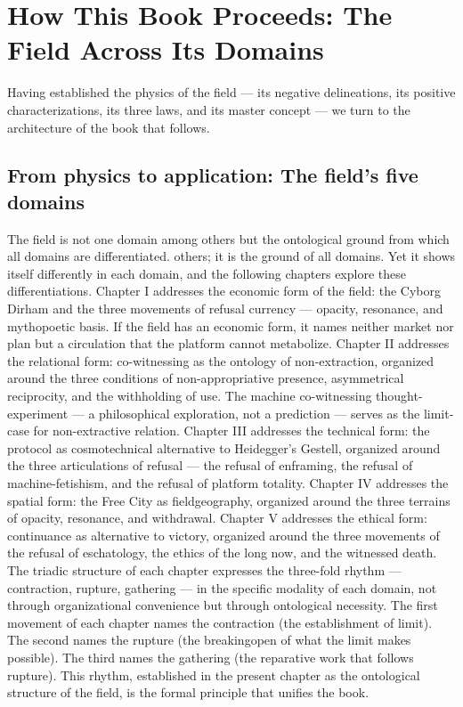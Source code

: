 \section{How This Book Proceeds: The Field Across Its Domains}

Having established the physics of the field --- its negative delineations, its positive characterizations, its three laws, and its master concept --- we turn to the architecture of the book that follows.

\subsection{From physics to application: The field's five domains}

The field is not one domain among others but the ontological ground from which all domains are differentiated. others; it is the ground of all domains. Yet it shows itself differently in each domain, and the following chapters explore these differentiations. Chapter I addresses the economic form of the field: the Cyborg Dirham and the three movements of refusal currency — opacity, resonance, and mythopoetic basis. If the field has an economic form, it names neither market nor plan but a circulation that the platform cannot metabolize. Chapter II addresses the relational form: co-witnessing as the ontology of non-extraction, organized around the three conditions of non-appropriative presence, asymmetrical reciprocity, and the withholding of use. The machine co-witnessing thought-experiment — a philosophical exploration, not a prediction — serves as the limit-case for non-extractive relation. Chapter III addresses the technical form: the   protocol as cosmotechnical alternative to Heidegger’s Gestell, organized around the three articulations of refusal — the refusal of enframing, the refusal of machine-fetishism, and the refusal of platform totality. Chapter IV addresses the spatial form: the Free City as fieldgeography, organized around the three terrains of opacity, resonance, and withdrawal. Chapter V addresses the ethical form: continuance as alternative to victory, organized around the three movements of the refusal of eschatology, the ethics of the long now, and the witnessed death. The triadic structure of each chapter expresses the three-fold rhythm — contraction, rupture, gathering — in the specific modality of each domain, not through organizational convenience but through ontological necessity. The first movement of each chapter names the contraction (the establishment of limit). The second names the rupture (the breakingopen of what the limit makes possible). The third names the gathering (the reparative work that follows rupture). This rhythm, established in the present chapter as the ontological structure of the field, is the formal principle that unifies the book.

